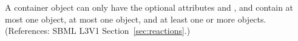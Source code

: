 A \ListOfLocalParameters container object can only have the optional
attributes  and , and contain at most one
\Notes object, at most one \Annotation object, and at least one or more
\LocalParameter objects.  (References: SBML L3V1
Section~\ref{sec:reactions}.)
